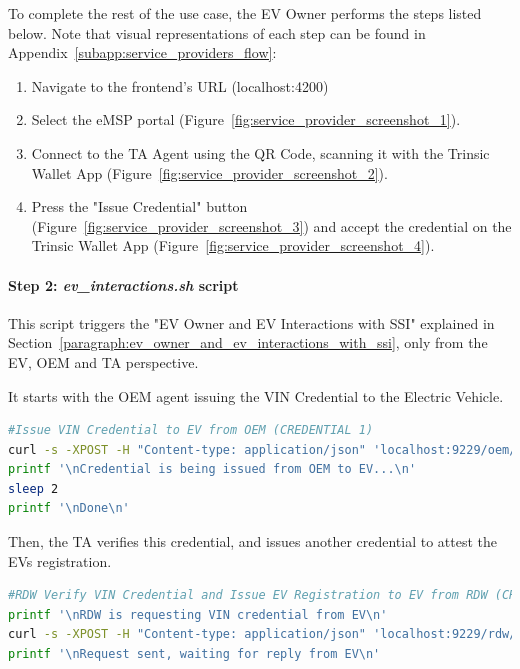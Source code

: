 To complete the rest of the use case, the EV Owner performs the steps listed below. Note that visual representations of each step can be found in Appendix~\ref{subapp:service_providers_flow}:

\begin{enumerate}
    \item Navigate to the frontend's URL (localhost:4200)
    \item Select the eMSP portal (Figure~\ref{fig:service_provider_screenshot_1}).
    \item Connect to the TA Agent using the QR Code, scanning it with the Trinsic Wallet App (Figure~\ref{fig:service_provider_screenshot_2}).
    \item Press the "Issue Credential" button (Figure~\ref{fig:service_provider_screenshot_3}) and accept the credential on the Trinsic Wallet App (Figure~\ref{fig:service_provider_screenshot_4}).
\end{enumerate}

\paragraph{Step 2: \textit{ev\_interactions.sh} script}

This script triggers the "EV Owner and EV Interactions with SSI" explained in Section~\ref{paragraph:ev_owner_and_ev_interactions_with_ssi}, only from the EV, OEM and TA perspective.

It starts with the OEM agent issuing the VIN Credential to the Electric Vehicle.

\begin{lstlisting}[language=bash]
#Issue VIN Credential to EV from OEM (CREDENTIAL 1)
curl -s -XPOST -H "Content-type: application/json" 'localhost:9229/oem/issue-credential/send' > /tmp/output.html
printf '\nCredential is being issued from OEM to EV...\n'
sleep 2
printf '\nDone\n'
\end{lstlisting}

Then, the TA verifies this credential, and issues another credential to attest the EVs registration.

\begin{lstlisting}[language=bash]
#RDW Verify VIN Credential and Issue EV Registration to EV from RDW (CREDENTIAL 2)
printf '\nRDW is requesting VIN credential from EV\n'
curl -s -XPOST -H "Content-type: application/json" 'localhost:9229/rdw/present-proof/send-request'  > /tmp/output.html
printf '\nRequest sent, waiting for reply from EV\n'
\end{lstlisting}

